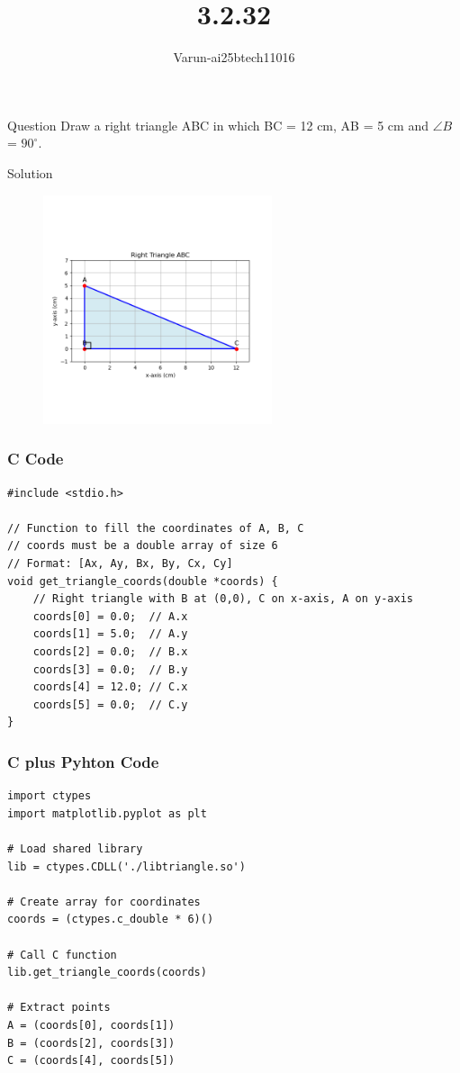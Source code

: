 \documentclass{beamer}
\title %
{3.2.32}
\author %
{Varun-ai25btech11016}
\begin{document}
\frame{\titlepage}
\begin{frame}{Question}
Draw a right triangle ABC in which BC = 12 cm, AB = 5 cm and $\angle B$ = $90^\circ$.
\end{frame}
\begin{frame}{Solution}

\begin{figure}[h!]
    \centering
\includegraphics[width=0.6\textwidth]{figs/3.2.32.png}
    \caption{}
    \label{fig:1}
\end{figure}
\end{frame}
\begin{frame}[fragile]
    \frametitle{C Code}
\begin{lstlisting}
#include <stdio.h>

// Function to fill the coordinates of A, B, C
// coords must be a double array of size 6
// Format: [Ax, Ay, Bx, By, Cx, Cy]
void get_triangle_coords(double *coords) {
    // Right triangle with B at (0,0), C on x-axis, A on y-axis
    coords[0] = 0.0;  // A.x
    coords[1] = 5.0;  // A.y
    coords[2] = 0.0;  // B.x
    coords[3] = 0.0;  // B.y
    coords[4] = 12.0; // C.x
    coords[5] = 0.0;  // C.y
}
\end{lstlisting}
\end{frame}
\begin{frame}[fragile]
    \frametitle{C plus Pyhton Code}
\begin{lstlisting}
import ctypes
import matplotlib.pyplot as plt

# Load shared library
lib = ctypes.CDLL('./libtriangle.so')

# Create array for coordinates
coords = (ctypes.c_double * 6)()

# Call C function
lib.get_triangle_coords(coords)

# Extract points
A = (coords[0], coords[1])
B = (coords[2], coords[3])
C = (coords[4], coords[5])
\end{lstlisting}
\end{frame}
\end{document}
